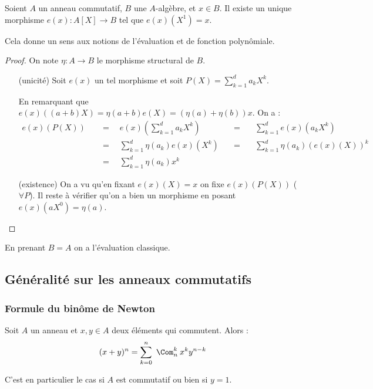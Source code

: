 \begin{prop}
 
Soient $A$ un anneau commutatif, $B$ une $A$-algèbre, et $x\in B$. Il existe un
unique morphisme $e(x) : A[X] \longrightarrow B$ tel que $e(x)(X^1) = x$.

Cela donne un sens aux notions de l'évaluation et de fonction polynômiale.
\end{prop}

\begin{proof}
On note $\eta : A \longrightarrow B$ le morphisme structural de $B$.
\begin{itemize}
 \item [(unicité)]
Soit $e(x)$ un tel morphisme et soit $P(X) = \sum_{k=1}^d a_kX^k$.

En remarquant que $e(x)((a+b)X) = \eta(a+b)e(X) = (\eta(a) + \eta(b))x$. On a
:
\begin{align*}
  e(x)(P(X)) & \quad = \quad e(x)(\sum_{k=1}^d a_kX^k)
             & \quad = \quad & \sum_{k=1}^d e(x)(a_kX^k)\\
             & \quad = \quad \sum_{k=1}^d \eta(a_k) e(x)(X^k)
             & \quad = \quad & \sum_{k=1}^d \eta(a_k) (e(x)(X))^k \\
             & \quad = \quad \sum_{k=1}^d \eta(a_k)x^k
\end{align*}

\item[(existence)]
On a vu qu'en fixant $e(x)(X) = x$ on fixe $e(x)(P(X))$ ($\forall P$). Il reste
à vérifier qu'on a bien un morphisme en posant $e(x)(aX^0) = \eta(a)$.
\end{itemize} \end{proof}

\begin{example}[Remarque]
 En prenant $B = A$ on a l'évaluation classique.
\end{example}

\subsection{Généralité sur les anneaux commutatifs}
\vspace{0.5em}
  \hfill

\vspace{0.5em}
\subsubsection{Formule du binôme de Newton}
\vspace{0.5em}
\begin{prop}

Soit $A$ un anneau et $x,y\in A$ deux éléments qui commutent. Alors :
\begin{displaymath} (x+y)^n = \sum_{k=0}^n\ \Com_n^k\: x^ky^{n-k}
\end{displaymath}

C'est en particulier le cas si $A$ est commutatif ou bien si $y=1$.
\end{prop}

